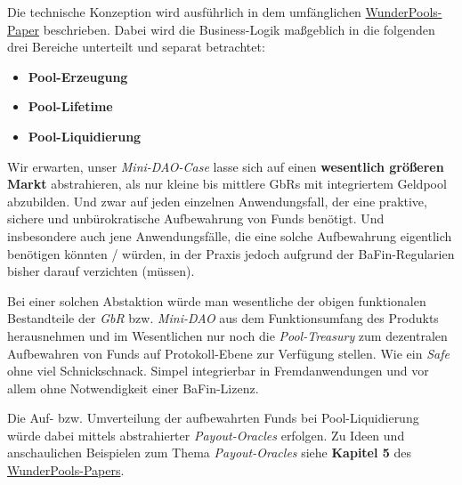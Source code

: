 \vspace{0.3cm}



\begin{Umsetzung*}

Die technische Konzeption wird ausführlich in dem umfänglichen \href{https://github.com/WunderPass/White-Paper/blob/main/pools.pdf}{WunderPools-Paper} beschrieben. Dabei wird die Business-Logik maßgeblich in die folgenden drei Bereiche unterteilt und separat betrachtet:

\begin{itemize}
  \item \textbf{Pool-Erzeugung}
  \item \textbf{Pool-Lifetime}
  \item \textbf{Pool-Liquidierung}
\end{itemize}

\end{Umsetzung*}

\vspace{0.3cm}


\begin{Ausblick*}

Wir erwarten, unser \textit{Mini-DAO-Case} lasse sich auf einen \textbf{wesentlich größeren Markt} abstrahieren, als nur kleine bis mittlere GbRs mit integriertem Geldpool abzubilden. Und zwar auf jeden einzelnen Anwendungsfall, der eine praktive, sichere und unbüro\-kratische Aufbewahrung von Funds benötigt. Und insbesondere auch jene Anwendungsfälle, die eine solche Aufbewahrung eigentlich benötigen könnten / würden, in der Praxis jedoch aufgrund der BaFin-Regularien bisher darauf verzichten (müssen).

\vspace{0.3cm}

Bei einer solchen Abstaktion würde man wesentliche der obigen funktionalen Bestandteile der \textit{GbR} bzw. \textit{Mini-DAO} aus dem Funktionsumfang des Produkts herausnehmen und im Wesentlichen nur noch die \textit{Pool-Treasury} zum dezentralen Aufbewahren von Funds auf Protokoll-Ebene zur Verfügung stellen. Wie ein \textit{Safe} ohne viel Schnickschnack. Simpel integrierbar in Fremdanwendungen und vor allem ohne Notwendigkeit einer BaFin-Lizenz. 

\vspace{0.3cm}

Die Auf- bzw. Umverteilung der aufbewahrten Funds bei Pool-Liquidierung würde dabei mittels abstrahierter \textit{Payout-Oracles} erfolgen. Zu Ideen und anschaulichen Beispielen zum Thema \textit{Payout-Oracles} siehe \textbf{Kapitel 5} des \href{https://github.com/WunderPass/White-Paper/blob/main/pools.pdf}{WunderPools-Papers}.

\end{Ausblick*}

\vspace{0.3cm}





\vspace{0.5cm}